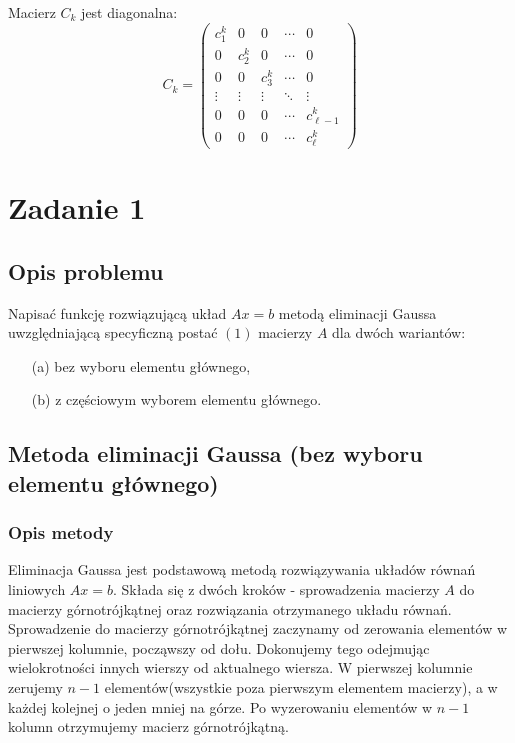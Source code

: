 \documentclass{article}
\begin{document}
Macierz $C_k$ jest diagonalna:
\[
C_k =
\begin{pmatrix}
c_1^k & 0 & 0 & \cdots & 0 \\
0 & c_2^k & 0 & \cdots & 0 \\
0 & 0 & c_3^k & \cdots & 0 \\
\vdots & \vdots & \vdots & \ddots & \vdots \\
0 & 0 & 0 & \cdots & c_{\ell-1}^k \\
0 & 0 & 0 & \cdots & c_\ell^k
\end{pmatrix}
\]

\section{Zadanie 1}
\subsection{Opis problemu}
Napisać funkcję rozwiązującą układ \( A x = b \) metodą eliminacji Gaussa uwzględniającą specyficzną postać \((1)\) macierzy \( A \) dla dwóch wariantów:
\begin{enumerate}
    \item[(a)] bez wyboru elementu głównego,
    \item[(b)] z częściowym wyborem elementu głównego.
\end{enumerate}

\subsection{Metoda eliminacji Gaussa (bez wyboru elementu głównego)}
\subsubsection{Opis metody}
Eliminacja Gaussa jest podstawową metodą rozwiązywania układów równań liniowych $Ax = b$.
Składa się z dwóch kroków - sprowadzenia macierzy $A$ do macierzy górnotrójkątnej oraz rozwiązania otrzymanego układu równań.\\

Sprowadzenie do macierzy górnotrójkątnej zaczynamy od zerowania elementów w pierwszej kolumnie, począwszy od dołu.
Dokonujemy tego odejmując wielokrotności innych wierszy od aktualnego wiersza.
W pierwszej kolumnie zerujemy $n - 1$ elementów(wszystkie poza pierwszym elementem macierzy), a w każdej kolejnej o jeden mniej na górze.
Po wyzerowaniu elementów w $n - 1$ kolumn otrzymujemy macierz górnotrójkątną.\\
\end{document}
